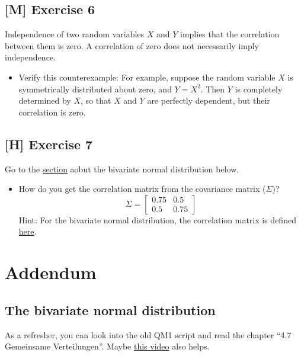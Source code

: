 \documentclass[
]{book}
\providecommand{\tightlist}{%
  \setlength{\itemsep}{0pt}\setlength{\parskip}{0pt}}
\begin{document}
\subsection{{[}M{]} Exercise 6}\label{exercise6_Intro}

Independence of two random variables \(X\) and \(Y\) implies that the
correlation between them is zero.
A correlation of zero does not necessarily imply independence.

\begin{itemize}
\tightlist
\item
  Verify this counterexample:
  For example, suppose the random variable \(X\) is symmetrically distributed about zero,
  and \(Y = X^2\). Then \(\mathit{Y}\) is completely determined by \(X\), so that
  \(\mathit{X}\) and \(\mathit{Y}\) are perfectly dependent, but their correlation is zero.
\end{itemize}

\subsection{{[}H{]} Exercise 7}\label{exercise7_Intro}

Go to the \hyperref[bivariate_normal]{section} aobut the bivariate normal distribution below.

\begin{itemize}
\tightlist
\item
  How do you get the correlation matrix from the covariance matrix (\(\Sigma\))?
  \[
  \Sigma =
  \begin{bmatrix}
  0.75 & 0.5 \\
  0.5 & 0.75
  \end{bmatrix}
  \]
  Hint: For the bivariate normal distribution, the correlation matrix is defined
  \href{https://en.wikipedia.org/wiki/Multivariate_normal_distribution\#Bivariate_case}{here}.
\end{itemize}

\section{Addendum}\label{addendum}

\subsection{The bivariate normal distribution}\label{bivariate_normal}

As a refresher, you can look into the old QM1 script and read the
chapter ``4.7 Gemeinsame Verteilungen''.
Maybe \href{https://www.youtube.com/watch?v=SP2GKq8xJ5I&ab_channel=StatisticsNinja}{this video}
also helps.
\end{document}
